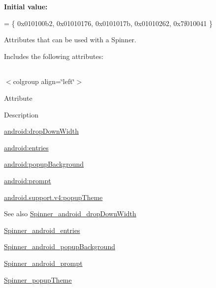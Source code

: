 {\bfseries Initial value\+:}
\begin{DoxyCode}
= \{
            0x010100b2, 0x01010176, 0x0101017b, 0x01010262,
            0x7f010041
        \}
\end{DoxyCode}
Attributes that can be used with a Spinner. 

Includes the following attributes\+:

\tabulinesep=1mm
\begin{longtabu} spread 0pt [c]{*{0}{|X[-1]}|}
\hline
\end{longtabu}
$<$colgroup align=\char`\"{}left\char`\"{}$>$ 

Attribute

Description 

{\ttfamily \hyperlink{classandroid_1_1support_1_1v4_1_1R_1_1styleable_aa72851d0a7ac8f88e7ca0609eec8d558}{android\+:drop\+Down\+Width}}

{\ttfamily \hyperlink{classandroid_1_1support_1_1v4_1_1R_1_1styleable_a19ec0a416c4257798426ba10a934a6f7}{android\+:entries}}

{\ttfamily \hyperlink{classandroid_1_1support_1_1v4_1_1R_1_1styleable_ab961b75d708bd81e22cb4bb95449e536}{android\+:popup\+Background}}

{\ttfamily \hyperlink{classandroid_1_1support_1_1v4_1_1R_1_1styleable_a509106a0db8c7a05859fb9c2c80450da}{android\+:prompt}}

{\ttfamily \hyperlink{classandroid_1_1support_1_1v4_1_1R_1_1styleable_a675a1650fe62d85b9e1c1f38de977d94}{android.\+support.\+v4\+:popup\+Theme}}

\begin{DoxySeeAlso}{See also}
\hyperlink{classandroid_1_1support_1_1v4_1_1R_1_1styleable_aa72851d0a7ac8f88e7ca0609eec8d558}{Spinner\+\_\+android\+\_\+drop\+Down\+Width} 

\hyperlink{classandroid_1_1support_1_1v4_1_1R_1_1styleable_a19ec0a416c4257798426ba10a934a6f7}{Spinner\+\_\+android\+\_\+entries} 

\hyperlink{classandroid_1_1support_1_1v4_1_1R_1_1styleable_ab961b75d708bd81e22cb4bb95449e536}{Spinner\+\_\+android\+\_\+popup\+Background} 

\hyperlink{classandroid_1_1support_1_1v4_1_1R_1_1styleable_a509106a0db8c7a05859fb9c2c80450da}{Spinner\+\_\+android\+\_\+prompt} 

\hyperlink{classandroid_1_1support_1_1v4_1_1R_1_1styleable_a675a1650fe62d85b9e1c1f38de977d94}{Spinner\+\_\+popup\+Theme} 
\end{DoxySeeAlso}
\mbox{\label{classandroid_1_1support_1_1v4_1_1R_1_1styleable_aa72851d0a7ac8f88e7ca0609eec8d558}} 
